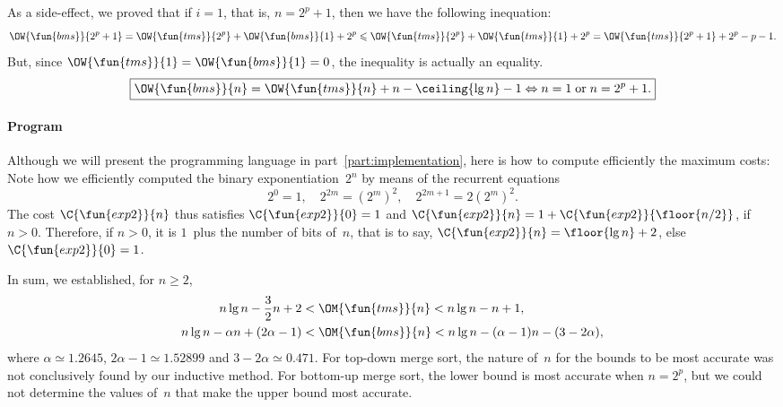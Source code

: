 As a side\hyp{}effect, we proved that if \(i=1\), that is, \(n=2^p +
1\), then we have the following inequation:
\begin{equation*}
\OW{\fun{bms}}{2^p+1} = \OW{\fun{tms}}{2^p} +
\OW{\fun{bms}}{1} + 2^p \leqslant \OW{\fun{tms}}{2^p} +
\OW{\fun{tms}}{1} + 2^p = \OW{\fun{tms}}{2^p+1} + 2^p - p - 1.
\end{equation*}
But, since \(\OW{\fun{tms}}{1} = \OW{\fun{bms}}{1} = 0\), the
inequality is actually an equality.
\begin{equation*}
\boxed{\OW{\fun{bms}}{n} = \OW{\fun{tms}}{n} + n - \ceiling{\lg n} - 1
  \Leftrightarrow n=1 \;\text{or}\; n=2^p+1.}
\end{equation*}

\paragraph{Program}

Although we will present the programming language \Erlang in
part~\ref{part:implementation}, here is how to compute efficiently the
maximum costs:  Note how we efficiently
computed the binary exponentiation~\(2^n\) by means of the recurrent
equations
\begin{equation*}
2^0 = 1,\quad 2^{2m} = (2^m)^2,\quad 2^{2m+1} =  2(2^m)^2.
\end{equation*}
The cost \(\C{\fun{exp2}}{n}\) thus satisfies \(\C{\fun{exp2}}{0} =
1\) and \(\C{\fun{exp2}}{n} = 1 + \C{\fun{exp2}}{\floor{n/2}}\), if
\(n > 0\). Therefore, if \(n > 0\), it is \(1\)~plus the number of
bits of~\(n\), that is to say, \(\C{\fun{exp2}}{n} = \floor{\lg n} +
2\), else \(\C{\fun{exp2}}{0} = 1\).


In sum, we established, for \(n \geqslant 2\),
\begin{align*}
n\lg n - \frac{3}{2}n + 2 &< \OM{\fun{tms}}{n} < n\lg n - n + 1,\\
n\lg n - \alpha n + (2\alpha - 1) &< \OM{\fun{bms}}{n}
< n\lg n - (\alpha - 1)n - (3 - 2\alpha),
\end{align*}
where \(\alpha \simeq 1.2645\), \(2\alpha - 1 \simeq 1.52899\) and \(3
- 2\alpha \simeq 0.471\). For top\hyp{}down merge sort, the nature
of~\(n\) for the bounds to be most accurate was not conclusively found
by our inductive method. For bottom\hyp{}up merge sort, the lower
bound is most accurate when \(n=2^p\), but we could not determine the
values of~\(n\) that make the upper bound most accurate.

